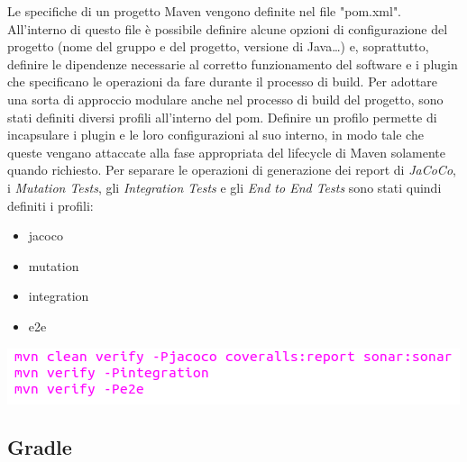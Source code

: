 Le specifiche di un progetto Maven vengono definite nel file "pom.xml".\newline
All'interno di questo file è possibile definire alcune opzioni di configurazione del progetto (nome del gruppo e del progetto, versione di Java\dots) e, soprattutto, definire le dipendenze necessarie al corretto funzionamento del software e i plugin che specificano le operazioni da fare durante il processo di build.\newline
Per adottare una sorta di approccio modulare anche nel processo di build del progetto, sono stati definiti diversi profili all'interno del pom.\newline
Definire un profilo permette di incapsulare i plugin e le loro configurazioni al suo interno, in modo tale che queste vengano attaccate alla fase appropriata del lifecycle di Maven solamente quando richiesto.\newline
Per separare le operazioni di generazione dei report di \textsl{JaCoCo}, i \textsl{Mutation Tests}, gli \textsl{Integration Tests} e gli \textsl{End to End Tests} sono stati quindi definiti i profili:
\begin{itemize}
	\item jacoco
	\item mutation
	\item integration
	\item e2e
\end{itemize}

\begin{minipage}{\linewidth}
	\includegraphics[width=\textwidth]{img/maven-goals.png}
\end{minipage}
\newline

\subsection{Gradle}

